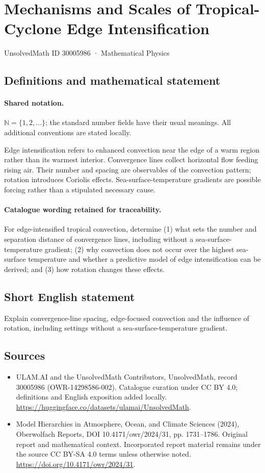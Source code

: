 \documentclass[11pt]{article}
\begin{document}
\setcounter{section}{30005985}
\section{Mechanisms and Scales of Tropical-Cyclone Edge Intensification}\label{30005986}
{\small UnsolvedMath ID 30005986 · Mathematical Physics}
\subsection{Definitions and mathematical statement}

\paragraph{Shared notation.}$\mathbb N=\{1,2,\ldots\}$; the standard number fields have their usual meanings. All additional conventions are stated locally.


Edge intensification refers to enhanced convection near the edge of a warm region rather than its warmest interior. Convergence lines collect horizontal flow feeding rising air. Their number and spacing are observables of the convection pattern; rotation introduces Coriolis effects. Sea-surface-temperature gradients are possible forcing rather than a stipulated necessary cause.

\paragraph{Catalogue wording retained for traceability.}
For edge-intensified tropical convection, determine (1) what sets the number and separation distance of convergence lines, including without a sea-surface-temperature gradient; (2) why convection does not occur over the highest sea-surface temperature and whether a predictive model of edge intensification can be derived; and (3) how rotation changes these effects.
\subsection{Short English statement}
Explain convergence-line spacing, edge-focused convection and the influence of rotation, including settings without a sea-surface-temperature gradient.
\subsection{Sources}
\begin{itemize}
\item[\hypertarget{source:30005986:1}{S1}] ULAM.AI and the UnsolvedMath Contributors, UnsolvedMath, record 30005986 (OWR-14298586-002). Catalogue curation under CC BY 4.0; definitions and English exposition added locally.
\url{https://huggingface.co/datasets/ulamai/UnsolvedMath}.
\item[\hypertarget{source:30005986:2}{S2}] Model Hierarchies in Atmosphere, Ocean, and Climate Sciences (2024), Oberwolfach Reports, DOI 10.4171/owr/2024/31, pp. 1731--1786. Original report and mathematical context. Incorporated report material remains under the source CC BY-SA 4.0 terms unless otherwise noted.
\url{https://doi.org/10.4171/owr/2024/31}.
\end{itemize}
\label{end:30005986}
\end{document}

